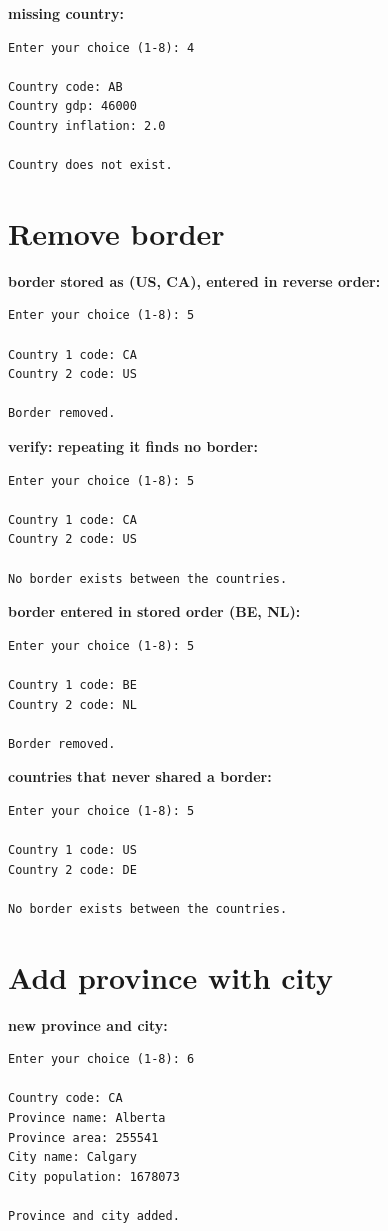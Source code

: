 \documentclass[11pt]{article}
\begin{document}
\noindent \textbf{missing country:}
{\small
\begin{verbatim}
Enter your choice (1-8): 4

Country code: AB
Country gdp: 46000
Country inflation: 2.0

Country does not exist.
\end{verbatim}
}

\section*{Remove border}

\noindent \textbf{border stored as (US, CA), entered in reverse order:}
{\small
\begin{verbatim}
Enter your choice (1-8): 5

Country 1 code: CA
Country 2 code: US

Border removed.
\end{verbatim}
}

\noindent \textbf{verify: repeating it finds no border:}
{\small
\begin{verbatim}
Enter your choice (1-8): 5

Country 1 code: CA
Country 2 code: US

No border exists between the countries.
\end{verbatim}
}

\noindent \textbf{border entered in stored order (BE, NL):}
{\small
\begin{verbatim}
Enter your choice (1-8): 5

Country 1 code: BE
Country 2 code: NL

Border removed.
\end{verbatim}
}

\noindent \textbf{countries that never shared a border:}
{\small
\begin{verbatim}
Enter your choice (1-8): 5

Country 1 code: US
Country 2 code: DE

No border exists between the countries.
\end{verbatim}
}

\section*{Add province with city}

\noindent \textbf{new province and city:}
{\small
\begin{verbatim}
Enter your choice (1-8): 6

Country code: CA
Province name: Alberta
Province area: 255541
City name: Calgary
City population: 1678073

Province and city added.
\end{verbatim}
}
\end{document}
